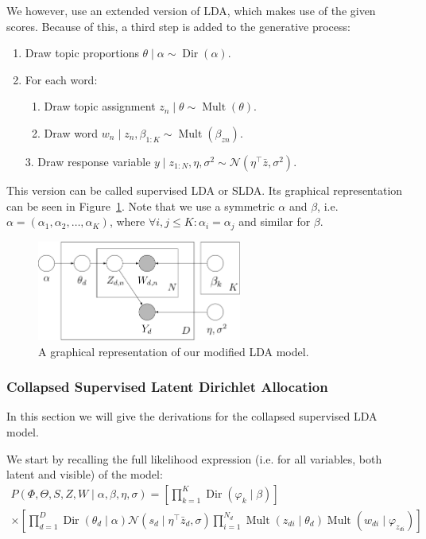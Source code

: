 \documentclass{article} %
\DeclareMathOperator{\Dir}{Dir}
\DeclareMathOperator{\Mult}{Mult}
\renewcommand{\phi}{\varphi}
\begin{document}
We however, use an extended version of LDA, which makes use of the given scores. 
Because of this, a third step is added to the generative process:

\begin{enumerate}
  \item Draw topic proportions $\theta \mid \alpha \sim \Dir(\alpha)$.
  \item For each word:
  \begin{enumerate}
    \item Draw topic assignment $z_n \mid \theta \sim \Mult(\theta)$.
    \item Draw word $w_n \mid z_n, \beta_{1:K} \sim \Mult(\beta_{zn})$.
  \end{enumerate}
  \item[3.] Draw response variable $y \mid z_{1:N}, \eta, \sigma^2 \sim \mathcal{N}(\eta^\top \bar{z}, \sigma^2)$.
\end{enumerate}

This version can be called supervised LDA or SLDA.
Its graphical representation can be seen in Figure~\ref{fig:SLDA}.
Note that we use a symmetric $\alpha$ and $\beta$, i.e. $\alpha=(\alpha_1, \alpha_2, \dots, \alpha_K)$, where $\forall i,j \leq K: \alpha_i = \alpha_j$ and similar for $\beta$.

\begin{figure}[ht!]
  \centering
  \includegraphics[width=0.6\textwidth]{SLDA.png}
  \caption{A graphical representation of our modified LDA model.}
  \label{fig:SLDA}
\end{figure}

\subsubsection{Collapsed Supervised Latent Dirichlet Allocation}
In this section we will give the derivations for the collapsed supervised LDA model.

We start by recalling the full likelihood expression (i.e. for all variables, both latent and visible) of the model:
\begin{equation}
\label{eq:prodpart}
\begin{gathered}
P(\Phi, \Theta, S, Z, W \mid \alpha, \beta, \eta, \sigma) = \left[ \prod_{k = 1}^K \Dir(\phi_k \mid \beta) \right]  \\
\times \left[ \prod_{d = 1}^D \Dir(\theta_d \mid \alpha) \mathcal{N}(s_d \mid \eta^\top \bar{z}_d, \sigma) \prod_{i = 1}^{N_d} \Mult(z_{di} \mid \theta_d) \Mult(w_{di} \mid \varphi_{z_{di}}) \right]
\end{gathered}
\end{equation}
\end{document}
